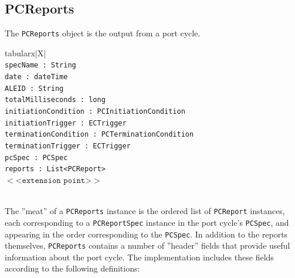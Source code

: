 \documentclass[11pt,a4paper,oneside]{article}
\newenvironment{bbox}%
{\begin{table}[h!]\begin{threeparttable}}%
{\end{threeparttable}\end{table}\FloatBarrier}
\newenvironment{bbox}
{\ifvmode\IgnorePar\fi \EndP\Tg<div class='bbox'>}{\Tg</div>\IgnoreIndent}
\begin{document}
\subsection{PCReports}
\label{subsec:PCReports}
The \texttt{PCReports} object is the output from a port cycle.

\begin{bbox}
\begin{edtable}{tabularx}{\linewidth}{|X|}
\hline 
{}
\\
\texttt{specName : String}\\
\texttt{date : dateTime}\\
\texttt{ALEID : String}\\
\texttt{totalMilliseconds : long}\\
\texttt{initiationCondition : PCInitiationCondition}\\
\texttt{initiationTrigger : ECTrigger}\\
\texttt{terminationCondition : PCTerminationCondition}\\
\texttt{terminationTrigger : ECTrigger}\\
\texttt{pcSpec : PCSpec}\\
\texttt{reports : List<PCReport>}\\
$<$<$\texttt{extension point}$>$>$\\
\texttt{\textendash \textendash \textendash}\\
\hline
\end{edtable}
\end{bbox}

The ''meat'' of a \texttt{PCReports} instance is the ordered list of \texttt{PCReport} instances, each corresponding to a \texttt{PCReportSpec} instance in the port cycle's \texttt{PCSpec}, and appearing in the order corresponding to the \texttt{PCSpec}. In addition to the reports themselves, \texttt{PCReports} contains a number of ''header'' fields that provide useful information about the port cycle. The implementation includes these fields according to the following definitions:
\end{document}
